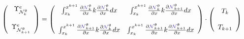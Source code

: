\[
\left(
\begin{array}{cc}
{\Upsilon}_{\bN_k^\uptheta}^e \\ \\ 
{\Upsilon}_{\bN_{k+1}^\uptheta}^e
\end{array}
\right)
=
\left(
\begin{array}{cc}
\int_{x_k}^{x^{k+1}} \frac{\partial {\color{Violet}\bN}_k^\uptheta}{\partial x} 
k \frac{\partial  {\color{Violet}\bN}_{k}^\uptheta } {\partial x}  dx & 
\int_{x_k}^{x^{k+1}} \frac{\partial {\color{Violet}\bN}_k^\uptheta}{\partial x} 
k \frac{\partial  {\color{Violet}\bN}_{k+1}^\uptheta } {\partial x} dx 
\\ \\
\int_{x_k}^{x^{k+1}} \frac{\partial {\color{Violet}\bN}_{k+1}^\uptheta}{\partial x} 
k \frac{\partial  {\color{Violet}\bN}_{k}^\uptheta } {\partial x}  dx & 
\int_{x_k}^{x^{k+1}} \frac{\partial {\color{Violet}\bN}_{k+1}^\uptheta}{\partial x} 
k \frac{\partial  {\color{Violet}\bN}_{k+1}^\uptheta } {\partial x} dx 
\end{array}
\right)
\cdot
\left(
\begin{array}{c}
T_k \\ \\ T_{k+1}
\end{array}
\right)
\]

